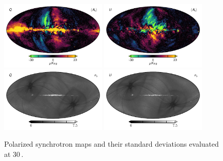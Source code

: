 \documentclass[twocolumn]{../../common/aa}
\newcommand{\BP}{\textsc{BeyondPlanck}}
\newcommand{\cosmoglobe}{\textsc{Cosmoglobe}}
\begin{document}
\begin{figure}
	\centering
	\includegraphics[width=0.45\textwidth]{figures/synch_Q.pdf}
	\includegraphics[width=0.45\textwidth]{figures/synch_U.pdf}\\
	\includegraphics[width=0.45\textwidth]{figures/synch_Q_std.pdf}
	\includegraphics[width=0.45\textwidth]{figures/synch_U_std.pdf}\\
	\caption{Polarized synchrotron maps and their standard deviations evaluated at 30\,\GHz.}\label{fig:polarized_foregrounds}
\end{figure}


\end{document}
